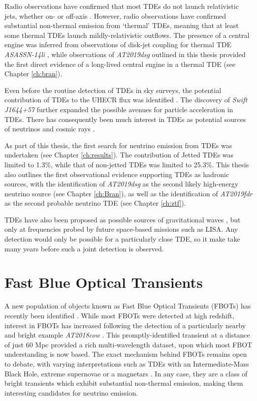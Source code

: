 Radio observations have confirmed that most TDEs do not launch relativistic jets, whether on- or off-axis . However, radio observations have confirmed substantial non-thermal emission from `thermal' TDEs, meaning that at least some thermal TDEs launch mildly-relativistic outflows. The presence of a central engine was inferred from observations of disk-jet coupling for thermal TDE \emph{ASASSN-14li} , while observations of \emph{AT2019dsg} outlined in this thesis provided the first direct evidence of a long-lived central engine in a thermal TDE (see Chapter \ref{ch:bran}).

Even before the routine detection of TDEs in sky surveys, the potential contribution of TDEs to the UHECR flux was identified . The discovery of \emph{Swift J1644+57} further expanded the possible avenues for particle acceleration in TDEs. There has consequently been much interest in TDEs as potential sources of neutrinos and cosmic rays . 

As part of this thesis, the first search for neutrino emission from TDEs was undertaken (see Chapter \ref{ch:results}). The contribution of Jetted TDEs was limited to 1.3\%, while that of non-jetted TDEs was limited to 25.3\%.  This thesis also outlines the first observational evidence supporting TDEs as hadronic sources, with the identification of \emph{AT2019dsg} as the second likely high-energy neutrino source (see Chapter \ref{ch:Bran}), as well as the identification of \emph{AT2019fdr} as the second probable neutrino TDE (see Chapter \ref{ch:ztf}).

TDEs have also been proposed as possible sources of gravitational waves , but only at frequencies probed by future space-based missions such as LISA. Any detection would only be possible for a particularly close TDE, so it make take many years before such a joint detection is observed.

\section{Fast Blue Optical Transients}
\label{sec:fbot}

A new population of objects known as Fast Blue Optical Transients (FBOTs) has recently been identified . While most FBOTs were detected at high redshift, interest in FBOTs has increased following the detection of a particularly nearby and bright example \emph{AT2018cow} . This promptly-identified transient at a distance of just 60 Mpc provided a rich multi-wavelength dataset, upon which most FBOT understanding is now based. The exact mechanism behind FBOTs remains open to debate, with varying interpretations such as TDEs with an Intermediate-Mass Black Hole, extreme supernovae or a magnetars . In any case, they are a class of bright transients which exhibit substantial non-thermal emission, making them interesting candidates for neutrino emission.

